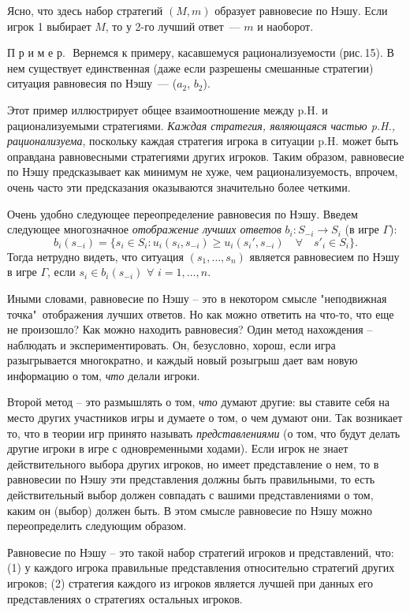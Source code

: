 {Ясно, что здесь набор стратегий $(M,m)$ образует равновесие по Нэшу.
Если игрок 1 выбирает $M$, то у 2-го лучший ответ~--- $m$ и
наоборот.
\smallskip

П р и м е р.\,\, Вернемся к примеру, касавшемуся рационализуемости
(рис.\,15).  В нем существует единственная (даже если разрешены
смешанные стратегии) ситуация равновесия по Нэшу~--- ($a_2$, $b_2$).

Этот пример иллюстрирует общее взаимоотношение между p.H. и
рационализуемыми стратегиями. {\it Каждая стратегия, являющаяся
частью p.H., рационализуема}, поскольку каждая стратегия игрока в
ситуации p.H. может быть оправдана равновесными стратегиями других
игроков.  Таким образом, равновесие по Нэшу предсказывает как
минимум не хуже, чем рационализуемость, впрочем, очень часто эти
предсказания оказываются значительно более четкими.

Очень удобно следующее переопределение равновесия по Нэшу. Введем
следующее многозначное \emph{отображение лучших ответов} $b_i:S_{-i}\to
S_i$ (в игре $\Gamma$):
$$
b_i(s_{-i})=\{s_i\in S_i:u_i(s_i,s_{-i})\ge
u_i(s_i',s_{-i})\quad\forall\quad s'_i\in S_i\}.
$$
Тогда нетрудно видеть, что ситуация $(s_1,\ldots,s_n)$ является
равновесием по Нэшу в игре $\Gamma$, если $s_i\in b_i(s_{-i})$
$\forall \,\, i=1,\ldots,n$.

Иными словами, равновесие по Нэшу -- это в некотором смысле
"неподвижная точка"\, отображения лучших ответов. Но как можно
ответить на что-то, что еще не произошло? Как можно находить
равновесия? Один метод нахождения -- наблюдать и экспериментировать.
Он, безусловно, хорош, если игра разыгрывается многократно, и каждый
новый розыгрыш дает вам новую информацию о том, \emph{что} делали игроки.

Второй метод -- это размышлять о том, \emph{что} думают другие: вы
ставите себя на место других участников игры и думаете о том, о чем
думают они. Так возникает то, что в теории игр принято называть
\emph{представлениями} (о том, что будут делать другие игроки в игре
с одновременными ходами). Если игрок не знает действительного выбора
других игроков, но имеет представление о нем, то в равновесии по
Нэшу эти представления должны быть правильными, то есть
действительный выбор должен совпадать с вашими представлениями о
том, каким он (выбор) должен быть. В этом смысле равновесие по Нэшу
можно переопределить следующим образом.

Равновесие по Нэшу -- это такой набор стратегий игроков и
представлений, что: (1) у каждого игрока правильные представления
относительно стратегий других игроков; (2) стратегия каждого из
игроков является лучшей при данных его представлениях о стратегиях
остальных игроков.

}
